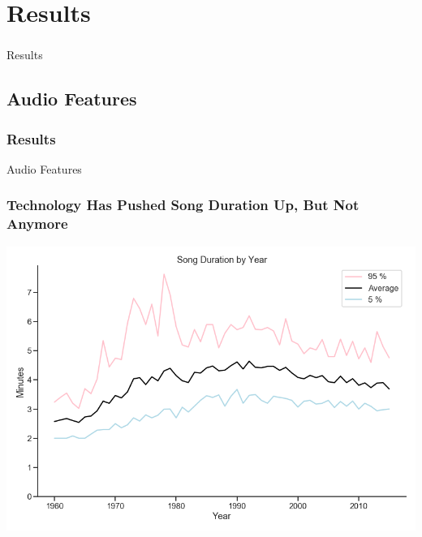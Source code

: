 \documentclass[10pt]{beamer}
\begin{document}
\section{Results}

\begin{frame}
\frametitle{}

\LARGE{\centerline{Results}}

\end{frame}

\subsection{Audio Features}

\begin{frame}
\frametitle{Results}

\LARGE{\centerline{Audio Features}}

\end{frame}

\begin{frame}
\frametitle{Technology Has Pushed Song Duration Up, But Not Anymore}

{
    \centering
    \includegraphics[width=\textwidth, height=\textheight,keepaspectratio]{average_duration_by_year.png}
    \par
}

\end{frame}
\end{document}
